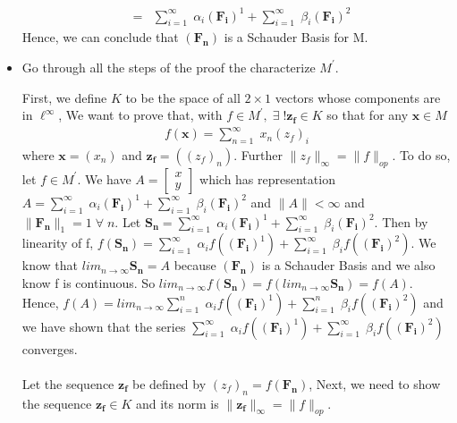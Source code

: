 \documentclass[11pt]{SelfArxOneColBMN}
\begin{document}
\begin{exercise}
\begin{itemize}
\begin{solution}
\begin{eqnarray*}
                &=& \sum_{i=1}^\infty\;\alpha_i\mathbf{(F_i)}^1 + \sum_{i=1}^\infty\;\beta_i\mathbf{(F_i)}^2
            \end{eqnarray*}
            Hence, we can conclude that $\mathbf{(F_n)}$ is a Schauder Basis for M.
        \end{solution}
        \item Go through all the steps of the proof the characterize $M^\prime$.
        \begin{solution}
        First, we define $K$ to be the space of all $2 \times 1$ vectors whose components are in $\ell^\infty$, We want to prove that, with $f \in M^\prime, \; \exists \; !\mathbf{z_f} \in K$ so that for any $\mathbf{x} \in M$
        \begin{eqnarray*}
            f(\mathbf{x}) = \sum_{n=1}^\infty\;x_n(z_f)_i
        \end{eqnarray*}
        where $\mathbf{x} = (x_n)$ and $\mathbf{z_f} = ((z_f)_n)$. Further $\|z_f\|_\infty = \|f\|_{op}$. To do so, let $f \in M^\prime$. We have $A =
        \begin{bmatrix}
        x\\
        y
        \end{bmatrix}
        $
        which has representation $A = \sum_{i=1}^\infty\;\alpha_i\mathbf{(F_i)}^1 + \sum_{i=1}^\infty\;\beta_i\mathbf{(F_i)}^2$ and $\|A\| < \infty$ and $\|\mathbf{F_n}\|_1 = 1 \; \forall \; n$. Let $\mathbf{S_n} = \sum_{i=1}^\infty\;\alpha_i\mathbf{(F_i)}^1 + \sum_{i=1}^\infty\;\beta_i\mathbf{(F_i)}^2$. Then by linearity of f, $f\mathbf{(S_n)} = \sum_{i=1}^\infty\;\alpha_i f(\mathbf{(F_i)}^1) + \sum_{i=1}^\infty\;\beta_i  f(\mathbf{(F_i)}^2)$. We know that $lim_{n\rightarrow\infty}\mathbf{S_n} = A$ because $\mathbf{(F_n)}$ is a Schauder Basis and we also know f is continuous. So $lim_{n\rightarrow\infty}f(\mathbf{S_n}) = f(lim_{n\rightarrow\infty}\mathbf{S_n}) = f(A)$. Hence, $f(A) = lim_{n\rightarrow\infty} \sum_{i=1}^n\;\alpha_if(\mathbf{(F_i)}^1) + \sum_{i=1}^n\;\beta_if(\mathbf{(F_i)}^2)$ and we have shown that the series $\sum_{i=1}^\infty\;\alpha_if(\mathbf{(F_i)}^1) + \sum_{i=1}^\infty\;\beta_if(\mathbf{(F_i)}^2)$ converges.\\
        \\
        Let the sequence $\mathbf{z_f}$ be defined by $(z_f)_n = f(\mathbf{F_n})$, Next, we need to show the sequence $\mathbf{z_f} \in K$ and its norm is $\|\mathbf{z_f}\|_\infty = \|f\|_{op}$.\\
        \\

\end{solution}
\end{itemize}
\end{exercise}
\end{document}
